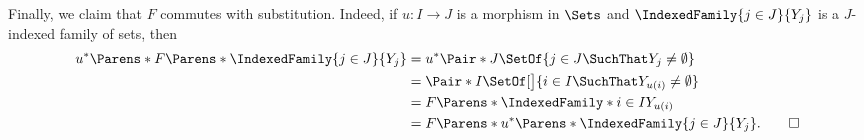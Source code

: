 \begin{solution}
Finally, we claim that \(F\) commutes with substitution.
Indeed, if \(u : I \to J\) is a morphism in \(\Sets\) and \(\IndexedFamily{j \in J}{Y_j}\) is a \(J\)-indexed family of sets, then
\begin{align*}
u^*\Parens*{F\Parens*{\IndexedFamily{j \in J}{Y_j}}}
&= u^*\Pair*{J}{\SetOf{j \in J \SuchThat Y_j \neq \emptyset}} \\
&= \Pair*{I}{\SetOf[\big]{i \in I \SuchThat Y_{u(i)} \neq \emptyset}} \\
&= F\Parens*{\IndexedFamily*{i \in I}{Y_{u(i)}}} \\
&= F\Parens*{u^*\Parens*{\IndexedFamily{j \in J}{Y_j}}}.
\qedhere
\end{align*}
\end{solution}
